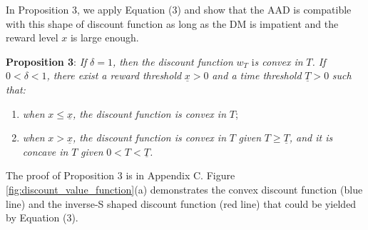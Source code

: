 \documentclass[
  12pt,
]{article}
\providecommand{\tightlist}{%
  \setlength{\itemsep}{0pt}\setlength{\parskip}{0pt}}
\begin{document}
In Proposition 3, we apply Equation (3) and show that the AAD is
compatible with this shape of discount function as long as the DM is
impatient and the reward level \(x\) is large enough.

\noindent \textbf{Proposition 3}: \emph{If} \(\delta =1\)\emph{, then
the discount function} \(w_T\) i\emph{s convex in} \(T\)\emph{. If}
\(0<\delta<1\)\emph{, there exist a reward threshold}
\(\underline{x}>0\) \emph{and a time threshold} \(\underline{T}>0\)
\emph{such that:}

\begin{enumerate}
\def\labelenumi{(\alph{enumi})}
\tightlist
\item
  \emph{when} \(x\leq \underline{x}\)\emph{, the discount function is
  convex in} \(T\);
\item
  \emph{when} \(x > \underline{x}\)\emph{, the discount function is
  convex in} \(T\) \emph{given} \(T\geq \underline{T}\)\emph{, and it is
  concave in} \(T\) \emph{given} \(0<T<\underline{T}\)\emph{.}
\end{enumerate}

The proof of Proposition 3 is in Appendix C. Figure
\ref{fig:discount_value_function}(a) demonstrates the convex discount
function (blue line) and the inverse-S shaped discount function (red
line) that could be yielded by Equation (3).
\end{document}
